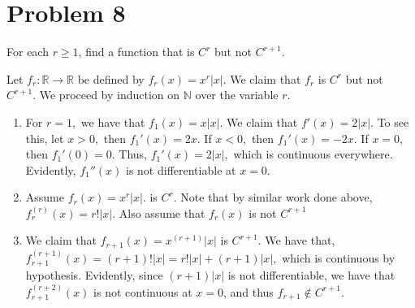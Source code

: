 \documentclass[11pt]{article}
\newcommand{\bbN}{\mathbb{N}}
\newcommand{\bbR}{\mathbb{R}}
\begin{document}
\section*{Problem 8}
\begin{problem}
    For each $r \geq 1$, find a function that is $C^r$ but not $C^{r+1}$.
\end{problem}
\begin{solution}
Let $f_r: \bbR \to \bbR$ be defined by $f_r(x) = x^r|x|.$ We claim that $f_r$ is $C^r$ but not $C^{r+1}.$ We proceed by induction on $\bbN$ over the variable $r.$
\begin{enumerate}
    \item For $r = 1,$ we have that $f_1(x) = x|x|.$ We claim that $f'(x) = 2|x|.$ To see this, let $x>0,$ then $f_1'(x) = 2x.$ If $x<0,$ then $f_1'(x) = -2x.$ If $x = 0,$ then $f_1'(0) = 0.$ Thus, $f_1'(x) = 2|x|,$ which is continuous everywhere. Evidently, $f_1''(x)$ is not differentiable at $x=0.$ 
    \item Assume $f_r(x) = x^r|x|.$ is $C^r.$ Note that by similar work done above, $f_r^{(r)}(x) = r!|x|.$ Also assume that $f_r(x)$ is not $C^{r+1}$
    \item We claim that $f_{r+1}(x) = x^{(r+1)}|x|$ is $C^{r+1}.$ We have that, $f_{r+1}^{(r+1)}(x) = (r+1)!|x| = r!|x| + (r+1)|x|,$ which is continuous by hypothesis. Evidently, since $(r+1)|x|$ is not differentiable, we have that $f_{r+1}^{(r+2)}(x)$ is not continuous at $x=0$, and thus $f_{r+1}\notin C^{r+1}.$
\end{enumerate}
\end{solution}
\end{document}

